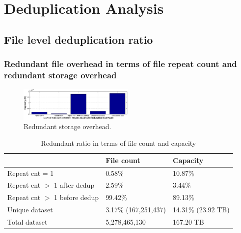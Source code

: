 \section{Deduplication Analysis}
\label{sec:dedup}

\subsection{File level deduplication ratio}

\subsubsection{Redundant file overhead in terms of file repeat count and redundant storage overhead}


\begin{figure}
	\centering
	\includegraphics[width=0.5\textwidth]{graphs/capacity_data_ratio.eps}
	\caption{Redundant storage overhead.
	}
	\label{fig_redundant_overhead}
\end{figure}

\begin{table} 
	\centering 
	\scriptsize  
	\caption{Redundant ratio in terms of file count and capacity} \label{tbl:schemes} 
	\begin{tabular}{|l|l|l|}%
		\hline 
		       & File count & Capacity \\
		\hline
		Repeat cnt = 1 & 0.58\% & 10.87\%\\
		\hline
		Repeat cnt $>$ 1 after dedup & 2.59\% & 3.44\%\\
		\hline
		Repeat cnt $>$ 1 before dedup  & 99.42\%  & 89.13\%\\
		\hline
		Unique dataset & 3.17\% (167,251,437)  &  14.31\% (23.92 TB) \\
		\hline 
		Total dataset & 5,278,465,130 & 167.20 TB \\
		\hline 	
	\end{tabular} 
\end{table} 

